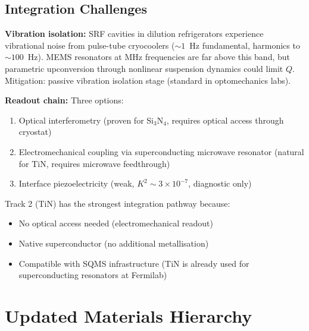 \documentclass[11pt]{article}
\theoremstyle{definition}
\theoremstyle{remark}
\newcommand{\ee}[1]{\times 10^{#1}}
\begin{document}
\subsection{Integration Challenges}

\textbf{Vibration isolation:} SRF cavities in dilution
refrigerators experience vibrational noise from pulse-tube
cryocoolers ($\sim 1$~Hz fundamental, harmonics to $\sim 100$~Hz).
MEMS resonators at MHz frequencies are far above this band, but
parametric upconversion through nonlinear suspension dynamics could
limit $Q$. Mitigation: passive vibration isolation stage (standard
in optomechanics labs).

\textbf{Readout chain:} Three options:
\begin{enumerate}[nosep]
\item Optical interferometry (proven for Si$_3$N$_4$, requires
  optical access through cryostat)
\item Electromechanical coupling via superconducting microwave
  resonator (natural for TiN, requires microwave feedthrough)
\item Interface piezoelectricity (weak, $K^2 \sim 3\ee{-7}$,
  diagnostic only)
\end{enumerate}

Track 2 (TiN) has the strongest integration pathway because:
\begin{itemize}[nosep]
\item No optical access needed (electromechanical readout)
\item Native superconductor (no additional metallisation)
\item Compatible with SQMS infrastructure (TiN is already used
  for superconducting resonators at Fermilab)
\end{itemize}


\section{Updated Materials Hierarchy}
\label{sec:hierarchy}
\end{document}
